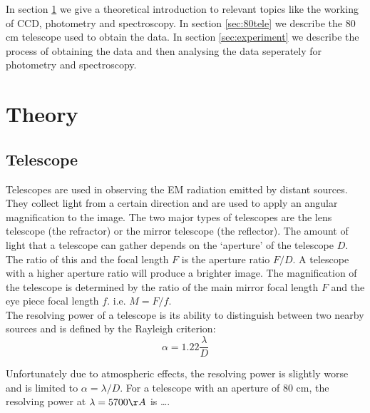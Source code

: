 \documentclass[12pt,a4paper]{article}
\begin{document}
  In section \ref{sec:theory} we give a theoretical introduction to relevant topics like the working of CCD, photometry and spectroscopy. In section \ref{sec:80tele} we describe the 80 cm telescope
  used to obtain the data. In section \ref{sec:experiment} we describe the process of obtaining the data and then analysing the data seperately for photometry and spectroscopy.
\section{Theory}\label{sec:theory}
\subsection{Telescope}
  Telescopes are used in observing the EM radiation emitted by distant sources. They collect light from a certain direction and are used to apply an angular magnification to the image. The two major types of telescopes are 
  the lens telescope (the refractor) or the mirror telescope (the reflector). The amount of light that a telescope can gather depends on the `aperture' of the telescope $D$. The ratio of this and the focal length
  $F$ is the aperture ratio $F/D$. A telescope with a higher aperture ratio will produce a brighter image. The magnification of the telescope is determined by the ratio of the main mirror focal length $F$ and the eye piece focal length
  $f$. i.e. $M = F/f$. 
  \\
  The resolving power of a telescope is its ability to distinguish between two nearby sources and is defined by the Rayleigh criterion:
  \begin{equation}
    \alpha = 1.22 \frac{\lambda}{D}
  \end{equation}

  Unfortunately due to atmospheric effects, the resolving power is slightly worse and is limited to $\alpha = \lambda/D$. For a telescope with an aperture of 80 cm, the resolving power
  at $\lambda = 5700 \AA$  is \dots.
\end{document}
